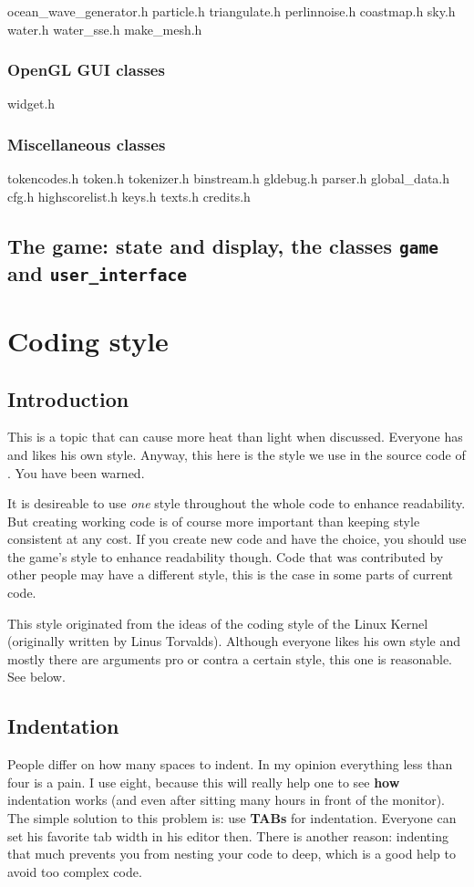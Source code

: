 \documentclass{report}
\begin{document}
ocean_wave_generator.h particle.h triangulate.h perlinnoise.h coastmap.h
sky.h water.h water_sse.h make_mesh.h

\subsubsection{OpenGL GUI classes}

widget.h

\subsubsection{Miscellaneous classes}

tokencodes.h token.h tokenizer.h binstream.h gldebug.h parser.h
global_data.h cfg.h highscorelist.h keys.h texts.h credits.h




\subsection{The game: state and display, the classes \texttt{game} and
  \texttt{user\_interface}}


\section{Coding style}

\subsection{Introduction}
This is a topic that can cause more heat than light when discussed.
Everyone has and likes his own style. Anyway, this here is the style we
use in the source code of \dftd. You have been warned.

It is desireable to use \emph{one} style throughout the whole code to
enhance readability. But creating working code is of course more
important than keeping style consistent at any cost. If you create new
code and have the choice, you should use the game's style to enhance
readability though.  Code that was contributed by other people may have
a different style, this is the case in some parts of current code.

This style originated from the ideas of the coding style of the Linux
Kernel (originally written by Linus Torvalds). Although everyone likes
his own style and mostly there are arguments pro or contra a certain
style, this one is reasonable. See below.
    

\subsection{Indentation}
People differ on how many spaces to indent. In my opinion everything
less than four is a pain. I use eight, because this will really help one
to see \textbf{how} indentation works (and even after sitting many hours
in front of the monitor). The simple solution to this problem is: use
\textbf{TABs} for indentation. Everyone can set his favorite tab width
in his editor then. There is another reason: indenting that much
prevents you from nesting your code to deep, which is a good help to
avoid too complex code.
    
\end{document}

